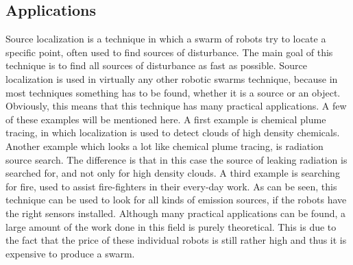 
\subsection{Applications}
Source localization is a technique in which a swarm of robots try to locate a specific point, often used to find sources of disturbance. 
The main goal of this technique is to find all sources of disturbance as fast as possible. 
Source localization is used in virtually any other robotic swarms technique, because in most techniques something has to be found, whether it is a source or an object. \\

Obviously, this means that this technique has many practical applications.
A few of these examples will be mentioned here. 
A first example is chemical plume tracing, in which localization is used to detect clouds of high density chemicals. \cite{zarzhitsky2005distributed}
Another example which looks a lot like chemical plume tracing, is radiation source search. \cite{bashyal2008human} The difference is that in this case the source of leaking radiation is searched for, and not only for high density clouds. 
A third example is searching for fire, used to assist fire-fighters in their every-day work. \cite{marjovi2009multi}
As can be seen, this technique can be used to look for all kinds of emission sources, if the robots have the right sensors installed. \cite{cui2004swarm}
Although many practical applications can be found, a large amount of the work done in this field is purely theoretical.
This is due to the fact that the price of these individual robots is still rather high and thus it is expensive to produce a swarm.




